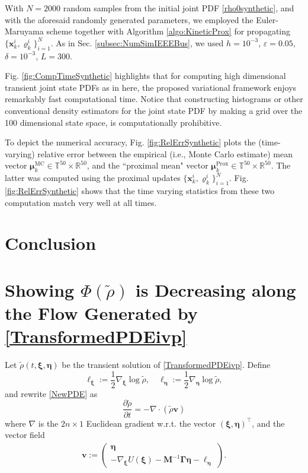 \documentclass[10pt,twocolumn]{IEEEtran}
\newcommand{\red}{\color{red}}
\begin{document}
With $N=2000$ random samples from the initial joint PDF \eqref{rho0synthetic}, and with the aforesaid randomly generated parameters, we employed the Euler-Maruyama scheme together with Algorithm \ref{algo:KineticProx} for propagating $\{\bm{x}_{k}^{i},\varrho_{k}^{i}\}_{i=1}^{N}$. As in Sec. \ref{subsec:NumSimIEEEBus}, we used $h=10^{-3}$, $\varepsilon = 0.05$, $\delta = 10^{-3}$, $L = 300$.

Fig. \ref{fig:CompTimeSynthetic} highlights that for computing high dimensional transient joint state PDFs as in here, the proposed variational framework enjoys remarkably fast computational time. Notice that constructing histograms or other conventional density estimators for the joint state PDF by making a grid over the 100 dimensional state space, is computationally prohibitive. 

To depict the numerical accuracy, Fig. \ref{fig:RelErrSynthetic} plots the (time-varying) relative error between the empirical (i.e., Monte Carlo estimate) mean vector $\bm{\mu}_{k}^{\text{MC}}\in\mathbb{T}^{50}\times\mathbb{R}^{50}$, and the ``proximal mean" vector $\bm{\mu}_{k}^{\text{Prox}}\in\mathbb{T}^{50}\times\mathbb{R}^{50}$. The latter was computed using the proximal updates $\{\bm{x}_{k}^{i},\varrho_{k}^{i}\}_{i=1}^{N}$. Fig. \ref{fig:RelErrSynthetic} shows that the time varying statistics from these two computation match very well at all times.





\section{Conclusion}\label{sec:conclusion}
{\red{The conclusion goes here.}}


\appendices
\section{Showing $\Phi(\tilde{\rho})$ is Decreasing along the Flow Generated by \eqref{TransformedPDEivp}}\label{AppLyap}
Let $\tilde{\rho}(t,\bm{\xi},\bm{\eta})$ be the transient solution of \eqref{TransformedPDEivp}. Define
$$\bm{\ell}_{\bm{\xi}} := \frac{1}{2}\nabla_{\bm{\xi}}\log\tilde{\rho}, \quad \bm{\ell}_{\bm{\eta}} := \frac{1}{2}\nabla_{\bm{\eta}}\log\tilde{\rho},$$
and rewrite \eqref{NewPDE} as
$$\dfrac{\partial\tilde{\rho}}{\partial t} = - \nabla\cdot\left(\tilde{\rho}\bm{v}\right)$$
where $\nabla$ is the $2n\times 1$ Euclidean gradient w.r.t. the vector $(\bm{\xi},\bm{\eta})^{\top}$, and the vector field
\begin{align}
\bm{v} := \begin{pmatrix}
 \bm{\eta}\\
 -\nabla_{\bm{\xi}}U(\bm{\xi}) - \bm{M}^{-1}\bm{\Gamma}\bm{\eta} - \bm{\ell}_{\bm{\eta}}	
 \end{pmatrix}.
\label{defvectorfieldv}	
\end{align}
\end{document}

